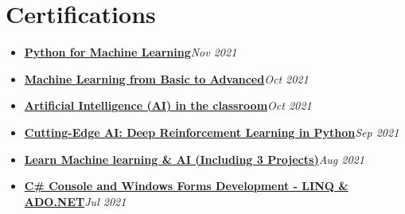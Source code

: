 \documentclass[a4paper]{article}
\begin{document}
\section*{Certifications}
\begin{itemize}[left=0pt]
 \item \textbf{\href{https://www.udemy.com/certificate/UC-76207d5f-bf68-4c5a-824a-4041d410daa9/}{Python for Machine Learning}}\hfill \textit{Nov 2021}
 \item \textbf{\href{https://www.udemy.com/certificate/UC-6bb2318e-779c-4a16-b478-37e08fbac05e/}{Machine Learning from Basic to Advanced}}\hfill \textit{Oct 2021}
 \item \textbf{\href{https://www.udemy.com/certificate/UC-defd535c-ccfb-4caa-be03-a2bc340e5676/}{Artificial Intelligence (AI) in the classroom}}\hfill \textit{Oct 2021}
 \item \textbf{\href{https://www.udemy.com/certificate/UC-f9ccd8f4-9edb-4c01-9173-77b9dd8ce194/}{Cutting-Edge AI: Deep Reinforcement Learning in Python}}\hfill \textit{Sep 2021}
 \item \textbf{\href{https://www.udemy.com/certificate/UC-d6e9bc83-bd0f-4de0-8e6d-9f1118998de5/}{Learn Machine learning \& AI (Including 3 Projects)}}\hfill \textit{Aug 2021}
 \item \textbf{\href{https://www.udemy.com/certificate/UC-df26016e-02b5-4816-9f0a-2718bb6c71f0/}{C\# Console and Windows Forms Development - LINQ \& ADO.NET}}\hfill \textit{Jul 2021}
\end{itemize}
\end{document}
